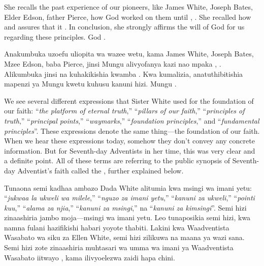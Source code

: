 She recalls the past experience of our pioneers, like James White, Joseph Bates, Elder Edson, father Pierce, how God worked on them until , . She recalled how  and assures that it . In conclusion, she strongly affirms the will of God for us regarding these principles. God .


Anakumbuka uzoefu uliopita wa wazee wetu, kama James White, Joseph Bates, Mzee Edson, baba Pierce, jinsi Mungu alivyofanya kazi nao mpaka , . Alikumbuka jinsi  na kuhakikishia kwamba . Kwa kumalizia, anatuthibitishia mapenzi ya Mungu kwetu kuhusu kanuni hizi. Mungu .


We see several different expressions that Sister White used for the foundation of our faith: “\textit{the platform of eternal truth},” “\textit{pillars of our faith},” “\textit{principles of truth},” “\textit{principal points},” “\textit{waymarks},” “\textit{foundation principles},” and “\textit{fundamental principles}”. These expressions denote the same thing—the foundation of our faith. When we hear these expressions today, somehow they don’t convey any concrete information. But for Seventh-day Adventists in her time, this was very clear and a definite point. All of these terms are referring to the public synopsis of Seventh-day Adventist’s faith called the , further explained below.


Tunaona semi kadhaa ambazo Dada White alitumia kwa msingi wa imani yetu: “\textit{jukwaa la ukweli wa milele},” “\textit{nguzo za imani yetu},” “\textit{kanuni za ukweli},” “\textit{pointi kuu},” “\textit{alama za njia},” “\textit{kanuni za msingi},” na “\textit{kanuni za kimsingi}”. Semi hizi zinaashiria jambo moja—msingi wa imani yetu. Leo tunaposikia semi hizi, kwa namna fulani hazifikishi habari yoyote thabiti. Lakini kwa Waadventista Wasabato wa siku za Ellen White, semi hizi zilikuwa na maana ya wazi sana. Semi hizi zote zinaashiria muhtasari wa umma wa imani ya Waadventista Wasabato iitwayo , kama ilivyoelezwa zaidi hapa chini.


